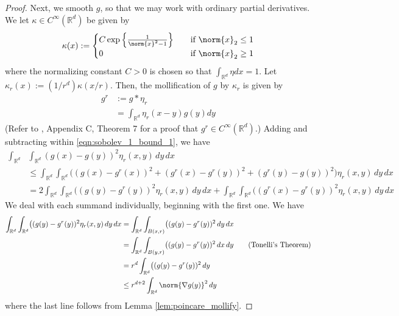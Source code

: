 \documentclass{article}
\newcommand{\Reals}{\mathbb{R}}
\newcommand{\1}{\mathbb{I}}
\newcommand{\Rd}{\Reals^d}
\theoremstyle{alden}
\theoremstyle{aldenthm}
\theoremstyle{definition}
\theoremstyle{remark}
\begin{document}
\begin{proof}
	Next, we smooth $g$, so that we may work with ordinary partial derivatives.
	We let $\kappa \in C^{\infty}(\Rd)$ be given by
	\begin{equation*}
	\kappa(x) :=
	\begin{cases}
	C \exp \left\{\frac{1}{\norm{x}^2 - 1}\right\}& \quad \textrm{if $\norm{x}_2 \leq 1$} \\
	0 & \quad \textrm{if $\norm{x}_2 \geq 1$}
	\end{cases}
	\end{equation*}
	where the normalizing constant $C > 0$ is chosen so that $\int_{\Rd} \eta dx = 1$. Let $\kappa_r(x) := (1/r^d) \kappa(x/r)$. Then, the mollification of $g$ by $\kappa_r$ is given by
	\begin{align*}
	g^r & := g \ast \eta_r \\
	& = \int_{\Rd} \eta_r(x - y) g(y) dy
	\end{align*}
	(Refer to \citep{evans10}, Appendix C, Theorem 7 for a proof that $g^r \in C^{\infty}(\Rd)$.)
	Adding and subtracting within \eqref{eqn:sobolev_1_bound_1}, we have
	\begin{align}
	\int_{\Rd} & \int_{\Rd} (g(x) - g(y))^2\eta_r(x,y) \,dy \,dx \\
	& \leq \int_{\Rd} \int_{\Rd} \bigl((g(x) - g^r(x))^2 + (g^r(x) - g^r(y))^2 + (g^r(y) - g(y))^2\bigr)\eta_r(x,y) \,dy \,dx \nonumber \\
	& = 2 \int_{\Rd} \int_{\Rd} \bigl((g(y) - g^r(y))^2 \eta_r(x,y) \,dy \,dx + \int_{\Rd} \int_{\Rd} \bigl((g^r(x) - g^r(y))^2 \eta_r(x,y) \,dy \,dx \label{eqn:sobolev_1_bound_5}
	\end{align}
	We deal with each summand individually, beginning with the first one. We have
	\begin{align}
	\int_{\Rd} \int_{\Rd} \bigl((g(y) - g^r(y))^2 \eta_r(x,y) \,dy \,dx & = \int_{\Rd} \int_{B(x,r)} \bigl((g(y) - g^r(y))^2\,dy \,dx \nonumber \\
	& = \int_{\Rd} \int_{B(y,r)} \bigl((g(y) - g^r(y))^2\,dx \,dy \tag{Tonelli's Theorem} \nonumber \\
	& = r^d \int_{\Rd}\bigl((g(y) - g^r(y))^2 \,dy \\
	& \leq r^{d + 2} \int_{\Rd} \norm{\nabla g(y)}^2 \,dy \label{eqn:sobolev_1_bound_4}
	\end{align}
	where the last line follows from Lemma \ref{lem:poincare_mollify}.
	

\end{proof}
\end{document}
